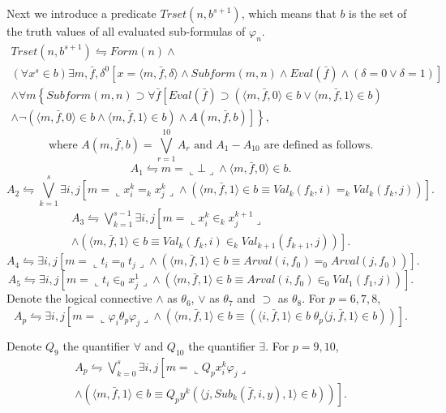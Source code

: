 \documentclass{asl}
\theoremstyle{definition}
\begin{document}
Next we introduce a predicate $Trset(n,b^{s+1})$, which  means that $b$ is the set of the truth values of all evaluated sub-formulas of $\varphi_n$.
\begin{multline*}
Trset(n,b^{s+1})\leftrightharpoons 
Form(n)\wedge
\\
(\forall x^s\in b)\exists m,\bar{f},\delta^0
\left[x=\langle m,\bar{f},\delta\rangle \wedge Subform(m,n)\wedge Eval(\bar{f})\wedge 
(\delta = 0 \vee \delta = 1)\right] 
\\  
\wedge\forall m\left\lbrace Subform(m,n)\supset \forall \bar{f}\left[ Eval(\bar{f})\supset 
(\langle m,\bar{f},0\rangle \in b \vee \langle m,\bar{f},1\rangle \in b)
\right.
\right.
\\
\left.
\left.
\wedge\neg (\langle m,\bar{f},0\rangle \in b \wedge \langle m,\bar{f},1\rangle \in b)
\wedge A(m,\bar{f},b)\right]\right\rbrace ,
\end{multline*}
\[\text{where }A(m,\bar{f},b)=\bigvee_{r=1}^{10}A_r\text{ and }A_1 - A_{10}\text{ are defined as follows.}\]
\[A_1\leftrightharpoons m=\llcorner\bot\lrcorner \wedge \langle m,\bar{f},0\rangle \in b.\]
\[A_2\leftrightharpoons \bigvee_{k=1}^s \exists i,j \left[m=\llcorner x_i^k=_k x_j^k\lrcorner \wedge 
\left(\langle m,\bar{f},1\rangle \in b \equiv Val_k(f_k,i)=_k Val_k(f_k,j)\right) \right]. \]
\begin{multline*}
A_3\leftrightharpoons 
\bigvee_{k=1}^{s-1} \exists i,j \left[m=\llcorner x_i^k\in_k x_j^{k+1}\lrcorner 
\right.
\\
\wedge 
\left.
\left(\langle m,\bar{f},1\rangle \in b \equiv Val_k(f_k,i)\in_k Val_{k+1}(f_{k+1},j)\right) \right]. 
\end{multline*}
\[A_4\leftrightharpoons \exists i,j \left[m=\llcorner t_i=_0t_j\lrcorner \wedge 
\left(\langle m,\bar{f},1\rangle \in b \equiv Arval(i,f_0)=_0Arval(j,f_0)\right) \right]. \]
\[A_5\leftrightharpoons 
\exists i,j \left[m=\llcorner t_i\in_0 x_j^1\lrcorner
\wedge 
\left(\langle m,\bar{f},1\rangle \in b \equiv Arval(i,f_0)\in_0 Val_1(f_1,j)\right) \right].\] 
Denote the logical connective $\wedge$ as $\theta_6$, $\vee$ as $\theta_7$ and $\supset$ as $\theta_8$. For $p=6, 7, 8$,
\[A_p\leftrightharpoons \exists i,j\left[m=\llcorner \varphi_i \theta_p \varphi_j\lrcorner \wedge \left(\langle m,\bar{f},1\rangle \in b \equiv \left(\langle i,\bar{f},1\rangle \in b \;\theta_p \langle j,\bar{f},1\rangle \in b \right)  \right) 
\right]. \]

Denote $Q_9$ the quantifier $\forall$ and $Q_{10}$ the quantifier $\exists$. For $p=9,10$,
\begin{multline*}
A_p\leftrightharpoons \bigvee_{k=0}^s\exists i,j\left[m=\llcorner Q_p x_i^k \varphi_j\lrcorner 
\right.
\\
\left.
\wedge \left(\langle m,\bar{f},1\rangle \in b \equiv 
Q_py^k(\langle j,Sub_k(\bar{f},i,y),1\rangle \in b )\right)\right].
\end{multline*}
\end{document}
